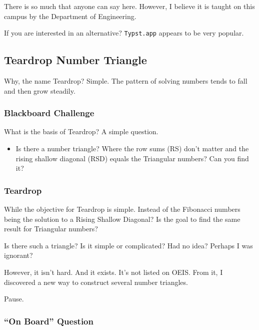 \documentclass[12pt]{article}
\begin{document}
        There is so much that anyone can say here. However, I believe it is taught on this campus 
        by the Department of Engineering.
        
        If you are interested in an alternative? \verb+Typst.app+ appears to be very popular.

    
    \subsection{Teardrop Number Triangle}
    \label{sec:16}

    Why, the name Teardrop? Simple. The pattern of solving numbers tends to fall and then grow 
    steadily.
    
        \subsubsection{Blackboard Challenge}
        \label{secb:18}
        
        What is the basis of Teardrop? A simple question.
        
        \begin{itemize}
            \item Is there a number triangle? Where the row sums (RS) don't matter and the rising 
            shallow diagonal (RSD) equals the Triangular numbers? Can you find it?
        \end{itemize}
        
        \subsubsection{Teardrop}
        \label{secb:19}
        
        While the objective for Teardrop is simple. Instead of the Fibonacci numbers being the 
        solution to a Rising Shallow Diagonal? Is the goal to find the same result for Triangular 
        numbers?
        
        Is there such a triangle? Is it simple or complicated? Had no idea? Perhaps I was 
        ignorant?
        
        However, it isn't hard. And it exists. It's not listed on OEIS. From it, I discovered a 
        new way to construct several number triangles.
        
        Pause.
        
        \subsubsection{``On Board'' Question}
        \label{secb:20}
        
\end{document}
